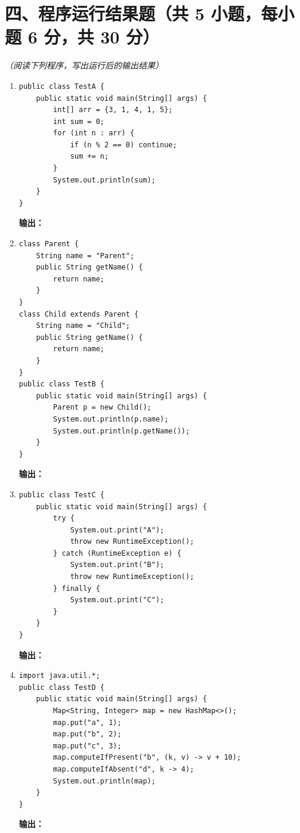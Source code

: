 \documentclass[a3paper, landscape, 11pt, twocolumn]{article}
\begin{document}
\section*{四、程序运行结果题（共 5 小题，每小题 6 分，共 30 分）}
\textit{（阅读下列程序，写出运行后的输出结果）}

\begin{enumerate}[label=\arabic*., itemsep=1em]
	\item
	      \begin{lstlisting}[style=JavaExam]
public class TestA {
    public static void main(String[] args) {
        int[] arr = {3, 1, 4, 1, 5};
        int sum = 0;
        for (int n : arr) {
            if (n % 2 == 0) continue;
            sum += n;
        }
        System.out.println(sum);
    }
}
\end{lstlisting}
	      \textbf{输出：}\underline{\hspace{5cm}}

	\item
	      \begin{lstlisting}[style=JavaExam]
class Parent {
    String name = "Parent";
    public String getName() {
        return name;
    }
}
class Child extends Parent {
    String name = "Child";
    public String getName() {
        return name;
    }
}
public class TestB {
    public static void main(String[] args) {
        Parent p = new Child();
        System.out.println(p.name);
        System.out.println(p.getName());
    }
}
\end{lstlisting}
	      \textbf{输出：}\underline{\hspace{5cm}}

	\item
	      \begin{lstlisting}[style=JavaExam]
public class TestC {
    public static void main(String[] args) {
        try {
            System.out.print("A");
            throw new RuntimeException();
        } catch (RuntimeException e) {
            System.out.print("B");
            throw new RuntimeException();
        } finally {
            System.out.print("C");
        }
    }
}
\end{lstlisting}
	      \textbf{输出：}\underline{\hspace{5cm}}

	\item
	      \begin{lstlisting}[style=JavaExam]
import java.util.*;
public class TestD {
    public static void main(String[] args) {
        Map<String, Integer> map = new HashMap<>();
        map.put("a", 1);
        map.put("b", 2);
        map.put("c", 3);
        map.computeIfPresent("b", (k, v) -> v + 10);
        map.computeIfAbsent("d", k -> 4);
        System.out.println(map);
    }
}
\end{lstlisting}
	      \textbf{输出：}\underline{\hspace{5cm}}


\end{enumerate}
\end{document}
